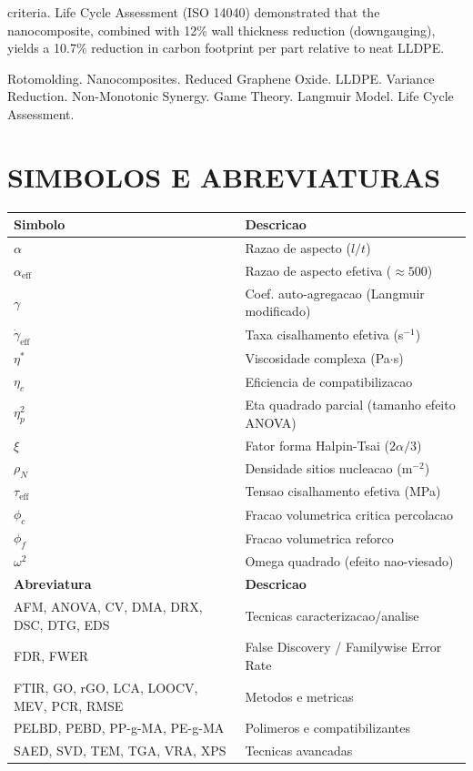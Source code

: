 \documentclass[11pt,a4paper,oneside]{article}
\begin{document}
criteria. Life Cycle Assessment (ISO 14040) demonstrated that the nanocomposite, combined with 12\% wall thickness reduction (downgauging), yields a 10.7\% reduction in carbon footprint per part relative to neat LLDPE.

\vspace{3pt}{\bfseries Keywords:} Rotomolding. Nanocomposites. Reduced Graphene Oxide. LLDPE. Variance Reduction. Non-Monotonic Synergy. Game Theory. Langmuir Model. Life Cycle Assessment.

\newpage
\renewcommand{\listfigurename}{FIGURAS}\listoffigures
\newpage
\renewcommand{\listtablename}{TABELAS}\listoftables
\newpage

\section*{SIMBOLOS E ABREVIATURAS}
\begin{longtable}{p{2.5cm} p{11.5cm}}\footnotesize
{\bfseries Simbolo} & {\bfseries Descricao} \\\midrule
$\alpha$ & Razao de aspecto ($l/t$)\\
$\alpha_{\text{eff}}$ & Razao de aspecto efetiva (${\approx}500$)\\
$\gamma$ & Coef. auto-agregacao (Langmuir modificado)\\
$\dot{\gamma}_{\text{eff}}$ & Taxa cisalhamento efetiva (s$^{-1}$)\\
$\eta^*$ & Viscosidade complexa (Pa$\cdot$s)\\
$\eta_c$ & Eficiencia de compatibilizacao\\
$\eta^2_p$ & Eta quadrado parcial (tamanho efeito ANOVA)\\
$\xi$ & Fator forma Halpin-Tsai ($2\alpha/3$)\\
$\rho_N$ & Densidade sitios nucleacao (m$^{-2}$)\\
$\tau_{\text{eff}}$ & Tensao cisalhamento efetiva (MPa)\\
$\phi_c$ & Fracao volumetrica critica percolacao\\
$\phi_f$ & Fracao volumetrica reforco\\
$\omega^2$ & Omega quadrado (efeito nao-viesado)\\\midrule
{\bfseries Abreviatura} & {\bfseries Descricao}\\\midrule
AFM, ANOVA, CV, DMA, DRX, DSC, DTG, EDS & Tecnicas caracterizacao/analise\\
FDR, FWER & False Discovery / Familywise Error Rate\\
FTIR, GO, rGO, LCA, LOOCV, MEV, PCR, RMSE & Metodos e metricas\\
PELBD, PEBD, PP-g-MA, PE-g-MA & Polimeros e compatibilizantes\\
SAED, SVD, TEM, TGA, VRA, XPS & Tecnicas avancadas\\
\end{longtable}
\end{document}
